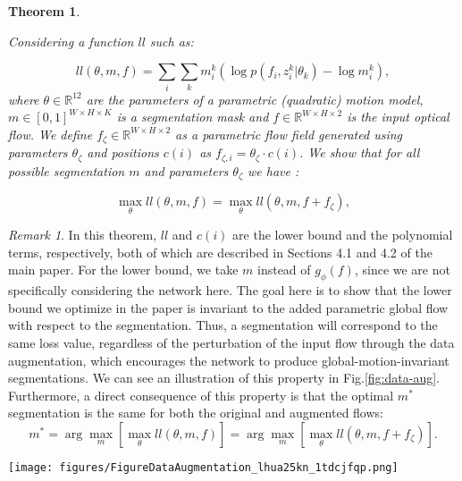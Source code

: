 \documentclass[10pt,twocolumn,letterpaper]{article}
\newcommand{\R}{\mathbb R}
\begin{document}
\newtheorem{theorem}{Theorem}
\theoremstyle{remark}
\newtheorem*{remark}{Remark}

\begin{theorem}\label{th:daug-inv}

Considering a function $ll$ such as: 

$$
ll(\theta, m, f) = \sum_i \sum_k  m_i^k  (\log p(f_i, z_i^k | \theta_k) - \log m_i^k),
$$
where $\theta  \in \R^{12}$ are the parameters of a parametric (quadratic) motion model, $m \in [0,1]^{W \times H \times K}$ is a segmentation mask and $f \in \R^{W \times H \times 2}$ is the input optical flow. We define $f_{\zeta} \in \R^{W \times H \times 2}$ as a parametric flow field generated using parameters $\theta_{\zeta}$ and positions $c(i)$ as $f_{\zeta, i} = \theta_{\zeta}\cdot c(i)$. We show that for all possible segmentation $m$ and parameters $\theta_{\zeta}$ we have : 

$$
\max_{\theta} ll(\theta, m, f) = \max_{\theta} ll(\theta, m, f + f_{\zeta}),
$$

\end{theorem}

\begin{remark}
In this theorem, $ll$ and $c(i)$ are the lower bound and the polynomial terms, respectively, both of which are described in Sections 4.1 and 4.2 of the main paper. For the lower bound, we take $m$ instead of $g_{\phi}(f)$, since we are not specifically considering the network here. The goal here is to show that the lower bound we optimize in the paper is invariant to the added parametric global flow with respect to the segmentation. Thus, a segmentation will correspond to the same loss value, regardless of the perturbation of the input flow through the data augmentation, which encourages the network to produce global-motion-invariant segmentations. We can see an illustration of this property in Fig.\ref{fig:data-aug}. Furthermore, a direct consequence of this property is that the optimal $m^*$ segmentation is the same for both the original and augmented flows: 
$$
m^* = \arg \max_m [ \max_{\theta} ll(\theta, m, f)] = \arg \max_m [ \max_{\theta} ll(\theta, m, f+f_{\zeta})].
$$
\end{remark}

\vspace{0.2cm}

\begin{figure*}
\label{fig:data-aug}
\texttt{[image: figures/FigureDataAugmentation\_lhua25kn\_1tdcjfqp.png]}
\caption{Data augmentation adding a quadratic global motion on the optical flow field. From top to bottom : Optical flow field displayed with the usual HSV code \cite{middlebury}; Predicted mask with our network trained using data augmentation; Predicted mask with our network trained without data augmentation; Ground-truth segmentation mask.}
\end{figure*}
\end{document}
